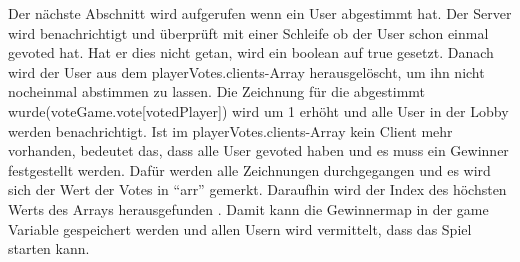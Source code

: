 Der nächste Abschnitt wird aufgerufen wenn ein User abgestimmt hat. Der Server wird benachrichtigt und überprüft mit einer Schleife ob der User
schon einmal gevoted hat. Hat er dies nicht getan, wird ein boolean auf true gesetzt.
Danach wird der User aus dem playerVotes.clients-Array herausgelöscht, um ihn nicht nocheinmal abstimmen zu lassen. Die Zeichnung für die abgestimmt wurde(voteGame.vote[votedPlayer]) wird um 1 erhöht und alle User in der Lobby werden benachrichtigt.
Ist im playerVotes.clients-Array kein Client mehr vorhanden, bedeutet das, dass alle User gevoted haben und es muss ein Gewinner festgestellt werden.
Dafür werden alle Zeichnungen durchgegangen und es wird sich der Wert der Votes in ``arr'' gemerkt. Daraufhin wird der Index des höchsten Werts des Arrays herausgefunden \cite{indexOfMax}. 
Damit kann die Gewinnermap in der game Variable gespeichert werden und allen Usern wird vermittelt, dass das Spiel starten kann.
